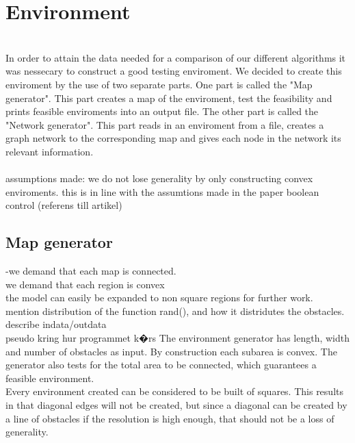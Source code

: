 \chapter{Environment}
\\In order to attain the data needed for a comparison of our different algorithms it was nessecary to construct a good testing enviroment. We decided to create this enviroment by the use of two separate parts. One part is called the "Map generator". This part creates a map of the enviroment, test the feasibility and prints feasible enviroments into an output file. The other part is called the "Network generator". This part reads in an enviroment from a file, creates a graph network to the corresponding map and gives each node in the network its relevant information.\\
\\assumptions made: we do not lose generality by only constructing convex enviroments. this is in line with the assumtions made in the paper boolean control (referens till artikel)
\section{Map generator}
-we demand that each map is connected.
\\ we demand that each region is convex
\\the model can easily be expanded to non square regions for further work.
\\mention distribution of the function rand(), and how it distridutes the obstacles.
\\describe indata/outdata
\\pseudo kring hur programmet k�rs
The environment generator has length, width and number of obstacles as input. By construction each subarea is convex. The generator also tests for the total area to be connected, which guarantees a feasible environment.\\
Every environment created can be considered to be built of squares. This results in that diagonal edges will not be created, but since a diagonal can be created by a line of obstacles if the resolution is high enough, that should not be a loss of generality. \\
